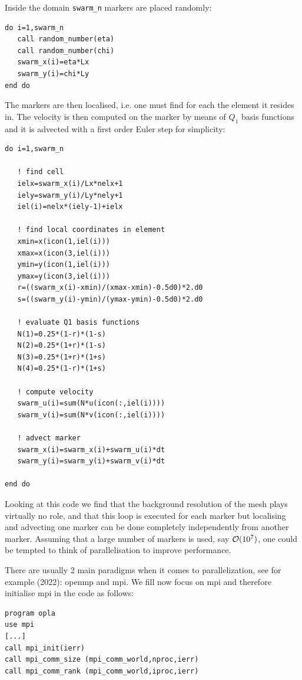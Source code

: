 Inside the domain \verb|swarm_n| markers are placed randomly:
\begin{verbatim}
do i=1,swarm_n
   call random_number(eta)
   call random_number(chi)
   swarm_x(i)=eta*Lx
   swarm_y(i)=chi*Ly
end do
\end{verbatim}

The markers are then localised, i.e. one must find for each the element it resides in.
The velocity is then computed on the marker by means of $Q_1$ basis functions
and it is advected with a first order Euler step for simplicity: 
\begin{verbatim}
do i=1,swarm_n

   ! find cell
   ielx=swarm_x(i)/Lx*nelx+1
   iely=swarm_y(i)/Ly*nely+1
   iel(i)=nelx*(iely-1)+ielx

   ! find local coordinates in element
   xmin=x(icon(1,iel(i)))
   xmax=x(icon(3,iel(i)))
   ymin=y(icon(1,iel(i)))
   ymax=y(icon(3,iel(i)))
   r=((swarm_x(i)-xmin)/(xmax-xmin)-0.5d0)*2.d0
   s=((swarm_y(i)-ymin)/(ymax-ymin)-0.5d0)*2.d0

   ! evaluate Q1 basis functions
   N(1)=0.25*(1-r)*(1-s)
   N(2)=0.25*(1+r)*(1-s)
   N(3)=0.25*(1+r)*(1+s)
   N(4)=0.25*(1-r)*(1+s)

   ! compute velocity
   swarm_u(i)=sum(N*u(icon(:,iel(i))))
   swarm_v(i)=sum(N*v(icon(:,iel(i))))

   ! advect marker
   swarm_x(i)=swarm_x(i)+swarm_u(i)*dt
   swarm_y(i)=swarm_y(i)+swarm_v(i)*dt

end do
\end{verbatim}

Looking at this code we find that the background resolution of the mesh 
plays virtually no role, and that this loop is executed for each marker
but localising and advecting one marker can be done completely 
independently from another marker. 
Assuming that a large number of markers is used, say ${\cal O}(10^7)$, 
one could be tempted to think of parallelisation to improve performance. 

There are usually 2 main paradigms when it comes to parallelization,
see for example \textcite{vacp22} (2022): openmp and mpi. 
We fill now focus on mpi and therefore initialise mpi in the code as follows:
 
\begin{verbatim}
program opla
use mpi
[...]
call mpi_init(ierr)
call mpi_comm_size (mpi_comm_world,nproc,ierr)
call mpi_comm_rank (mpi_comm_world,iproc,ierr)
\end{verbatim}


